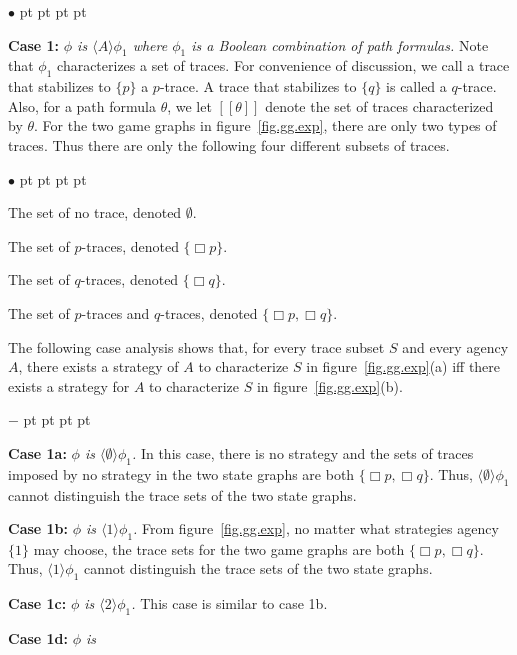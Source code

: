 \documentclass[11pt]{article}
\newcommand{\ldbrac}{[\![}
\newcommand{\rdbrac}{]\!]}
\newcommand{\pfrr}{\Box}
\newenvironment{list1}{\begin{list}{$\bullet$}
{\topsep 0 pt \parsep 0 pt \partopsep 0 pt \itemsep 0 pt}}{\end{list}}
\newenvironment{list2}{\begin{list}{$-$}
{\topsep 0 pt \parsep 0 pt \partopsep 0 pt \itemsep 0 pt}}{\end{list}}
\begin{document}
\begin{list1}
\item {\bf Case 1:} {\em $\phi$ is $\langle A\rangle\phi_1$
    where $\phi_1$ is a Boolean combination of path formulas.}
    Note that $\phi_1$ characterizes a set of traces.
    For convenience of discussion,
    we call a trace that stabilizes to $\{p\}$ a $p$-trace.
    A trace that stabilizes to $\{q\}$ is called a $q$-trace.
    Also, for a path formula $\theta$,
    we let $\ldbrac\theta\rdbrac$ denote the
    set of traces characterized by $\theta$.
    For the two game graphs in figure~\ref{fig.gg.exp},
    there are only two types of traces.
    Thus there are only the following
    four different subsets of traces.
    \begin{list1}
    \item The set of no trace, denoted $\emptyset$.
    \item The set of $p$-traces, denoted $\{\pfrr p\}$.
    \item The set of $q$-traces, denoted $\{\pfrr q\}$.
    \item The set of $p$-traces and $q$-traces,
        denoted $\{\pfrr p,\pfrr q\}$.
    \end{list1}
    The following case analysis shows that, for every
    trace subset $S$ and every agency $A$,
    there exists a strategy of $A$ to characterize
    $S$ in figure~\ref{fig.gg.exp}(a) iff
    there exists a strategy for $A$ to characterize
    $S$ in figure~\ref{fig.gg.exp}(b).
    \begin{list2}
    \item {\bf Case 1a:} {\em $\phi$ is $\langle\emptyset\rangle\phi_1$.}
        In this case, there is no strategy and the sets of traces
        imposed by no strategy in the two state graphs are
        both $\{\pfrr p,\pfrr q\}$.
        Thus, $\langle\emptyset\rangle\phi_1$ cannot distinguish the trace sets of the
        two state graphs.
    \item {\bf Case 1b:} {\em $\phi$ is $\langle 1\rangle\phi_1$.}
        From figure~\ref{fig.gg.exp}, no matter what strategies
        agency $\{1\}$ may choose, the
        trace sets for the two game graphs are both
        $\{\pfrr p,\pfrr q\}$.
        Thus, $\langle 1\rangle\phi_1$ cannot distinguish the trace sets of the
        two state graphs.
    \item {\bf Case 1c:} {\em $\phi$ is
        $\langle 2\rangle\phi_1$.}
        This case is similar to case 1b.
    \item {\bf Case 1d:} {\em $\phi$ is
}
\end{list2}
\end{list1}
\end{document}

